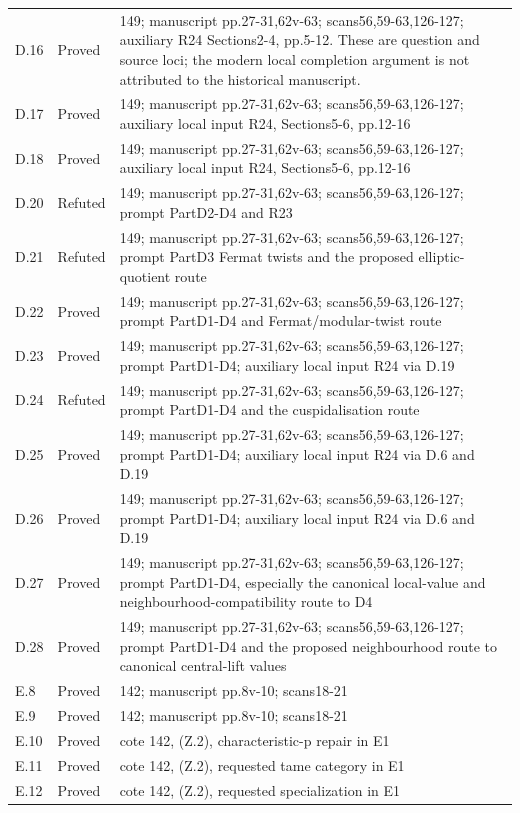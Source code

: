 {\begin{longtable}{p{1.9cm}p{1.7cm}p{10.3cm}}
D.16 & Proved & 149; manuscript pp.27-31,62v-63; scans56,59-63,126-127; auxiliary R24 Sections2-4, pp.5-12. These are question and source loci; the modern local completion argument is not attributed to the historical manuscript. \\
D.17 & Proved & 149; manuscript pp.27-31,62v-63; scans56,59-63,126-127; auxiliary local input R24, Sections5-6, pp.12-16 \\
D.18 & Proved & 149; manuscript pp.27-31,62v-63; scans56,59-63,126-127; auxiliary local input R24, Sections5-6, pp.12-16 \\
D.20 & Refuted & 149; manuscript pp.27-31,62v-63; scans56,59-63,126-127; prompt PartD2-D4 and R23 \\
D.21 & Refuted & 149; manuscript pp.27-31,62v-63; scans56,59-63,126-127; prompt PartD3 Fermat twists and the proposed elliptic-quotient route \\
D.22 & Proved & 149; manuscript pp.27-31,62v-63; scans56,59-63,126-127; prompt PartD1-D4 and Fermat/modular-twist route \\
D.23 & Proved & 149; manuscript pp.27-31,62v-63; scans56,59-63,126-127; prompt PartD1-D4; auxiliary local input R24 via D.19 \\
D.24 & Refuted & 149; manuscript pp.27-31,62v-63; scans56,59-63,126-127; prompt PartD1-D4 and the cuspidalisation route \\
D.25 & Proved & 149; manuscript pp.27-31,62v-63; scans56,59-63,126-127; prompt PartD1-D4; auxiliary local input R24 via D.6 and D.19 \\
D.26 & Proved & 149; manuscript pp.27-31,62v-63; scans56,59-63,126-127; prompt PartD1-D4; auxiliary local input R24 via D.6 and D.19 \\
D.27 & Proved & 149; manuscript pp.27-31,62v-63; scans56,59-63,126-127; prompt PartD1-D4, especially the canonical local-value and neighbourhood-compatibility route to D4 \\
D.28 & Proved & 149; manuscript pp.27-31,62v-63; scans56,59-63,126-127; prompt PartD1-D4 and the proposed neighbourhood route to canonical central-lift values \\
E.8 & Proved & 142; manuscript pp.8v-10; scans18-21 \\
E.9 & Proved & 142; manuscript pp.8v-10; scans18-21 \\
E.10 & Proved & cote 142, (Z.2), characteristic-p repair in E1 \\
E.11 & Proved & cote 142, (Z.2), requested tame category in E1 \\
E.12 & Proved & cote 142, (Z.2), requested specialization in E1 \\

\end{longtable}}
